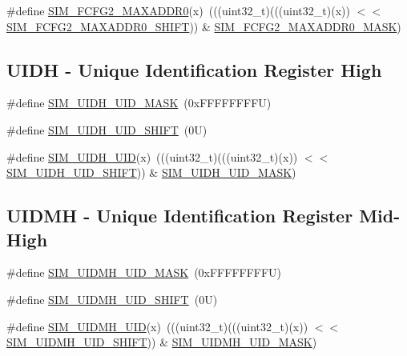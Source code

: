 \begin{DoxyCompactItemize}
\item 
\#define \mbox{\hyperlink{group___s_i_m___register___masks_gae7829e3338a5d460d360b8ed9e06e1e1}{S\+I\+M\+\_\+\+F\+C\+F\+G2\+\_\+\+M\+A\+X\+A\+D\+D\+R0}}(x)~(((uint32\+\_\+t)(((uint32\+\_\+t)(x)) $<$$<$ \mbox{\hyperlink{group___s_i_m___register___masks_ga3ccb8fde0ef2e170d0c84cdfa3651d34}{S\+I\+M\+\_\+\+F\+C\+F\+G2\+\_\+\+M\+A\+X\+A\+D\+D\+R0\+\_\+\+S\+H\+I\+FT}})) \& \mbox{\hyperlink{group___s_i_m___register___masks_gad1096c0a75d0bf4dfc93f4b1957fe493}{S\+I\+M\+\_\+\+F\+C\+F\+G2\+\_\+\+M\+A\+X\+A\+D\+D\+R0\+\_\+\+M\+A\+SK}})
\end{DoxyCompactItemize}
\subsection*{U\+I\+DH -\/ Unique Identification Register High}
\begin{DoxyCompactItemize}
\item 
\#define \mbox{\hyperlink{group___s_i_m___register___masks_ga313fa2a8e328043458a9ec1e3125c75f}{S\+I\+M\+\_\+\+U\+I\+D\+H\+\_\+\+U\+I\+D\+\_\+\+M\+A\+SK}}~(0x\+F\+F\+F\+F\+F\+F\+F\+F\+U)
\item 
\#define \mbox{\hyperlink{group___s_i_m___register___masks_ga2984b4c4d6bb4339997aee03c8a263b1}{S\+I\+M\+\_\+\+U\+I\+D\+H\+\_\+\+U\+I\+D\+\_\+\+S\+H\+I\+FT}}~(0\+U)
\item 
\#define \mbox{\hyperlink{group___s_i_m___register___masks_gad7d5c35aa9229aeef495aad5e234d799}{S\+I\+M\+\_\+\+U\+I\+D\+H\+\_\+\+U\+ID}}(x)~(((uint32\+\_\+t)(((uint32\+\_\+t)(x)) $<$$<$ \mbox{\hyperlink{group___s_i_m___register___masks_ga2984b4c4d6bb4339997aee03c8a263b1}{S\+I\+M\+\_\+\+U\+I\+D\+H\+\_\+\+U\+I\+D\+\_\+\+S\+H\+I\+FT}})) \& \mbox{\hyperlink{group___s_i_m___register___masks_ga313fa2a8e328043458a9ec1e3125c75f}{S\+I\+M\+\_\+\+U\+I\+D\+H\+\_\+\+U\+I\+D\+\_\+\+M\+A\+SK}})
\end{DoxyCompactItemize}
\subsection*{U\+I\+D\+MH -\/ Unique Identification Register Mid-\/\+High}
\begin{DoxyCompactItemize}
\item 
\#define \mbox{\hyperlink{group___s_i_m___register___masks_ga38dffcb27b09a015e2f2e7812d42477c}{S\+I\+M\+\_\+\+U\+I\+D\+M\+H\+\_\+\+U\+I\+D\+\_\+\+M\+A\+SK}}~(0x\+F\+F\+F\+F\+F\+F\+F\+F\+U)
\item 
\#define \mbox{\hyperlink{group___s_i_m___register___masks_ga56b83da182908eb5c406181b72870e54}{S\+I\+M\+\_\+\+U\+I\+D\+M\+H\+\_\+\+U\+I\+D\+\_\+\+S\+H\+I\+FT}}~(0\+U)
\item 
\#define \mbox{\hyperlink{group___s_i_m___register___masks_ga62269c010d4ee5e3036fea63bbe21702}{S\+I\+M\+\_\+\+U\+I\+D\+M\+H\+\_\+\+U\+ID}}(x)~(((uint32\+\_\+t)(((uint32\+\_\+t)(x)) $<$$<$ \mbox{\hyperlink{group___s_i_m___register___masks_ga56b83da182908eb5c406181b72870e54}{S\+I\+M\+\_\+\+U\+I\+D\+M\+H\+\_\+\+U\+I\+D\+\_\+\+S\+H\+I\+FT}})) \& \mbox{\hyperlink{group___s_i_m___register___masks_ga38dffcb27b09a015e2f2e7812d42477c}{S\+I\+M\+\_\+\+U\+I\+D\+M\+H\+\_\+\+U\+I\+D\+\_\+\+M\+A\+SK}})
\end{DoxyCompactItemize}
